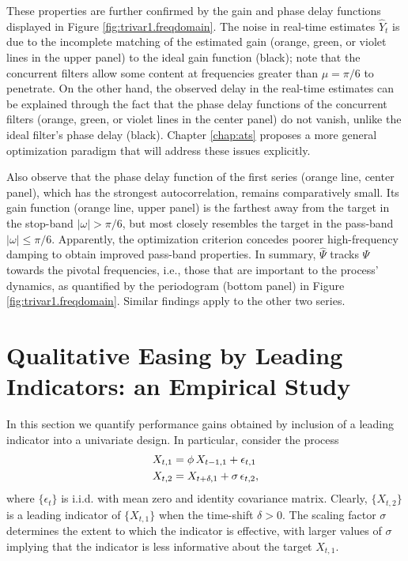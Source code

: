 \documentclass[a4paper]{book}
\begin{document}
 These properties are further confirmed by the gain and phase delay
 functions displayed   in Figure \ref{fig:trivar1.freqdomain}.   
 The noise  in real-time estimates $\widehat{Y}_t$  
 is due to the incomplete matching of the estimated gain (orange, green, or
 violet lines in the upper panel) to the ideal gain function (black); 
  note that the concurrent
 filters allow some   content at frequencies greater than $\mu = \pi/6$
 to penetrate.  On the other hand, the observed delay in the real-time
 estimates can be explained through the fact that the phase delay functions
 of the concurrent filters (orange, green, or
 violet lines in the center panel) do not vanish, unlike the ideal
 filter's phase delay (black).    Chapter \ref{chap:ats} 
proposes a more general optimization paradigm that will address these issues 
explicitly.

 Also observe that the phase delay function of the first series
 (orange line, center panel), which has the strongest autocorrelation,
  remains comparatively small. Its gain function (orange line, upper panel) 
 is the farthest away from the target in the stop-band $|\omega| >\pi/6$,
   but most closely resembles the target in the pass-band 
	$|\omega| \leq\pi/6$.
  Apparently,  the optimization criterion concedes
 poorer high-frequency damping to obtain improved pass-band properties. 
 In summary, $\widehat{\Psi}$ tracks $\Psi$ towards the pivotal
 frequencies, i.e., those that are important to the process'
 dynamics, as quantified by the periodogram (bottom panel) in 
 Figure \ref{fig:trivar1.freqdomain}.  
Similar findings apply to the other two series.




\section{Qualitative Easing by Leading Indicators: an Empirical Study}
   \label{sec:leading.ind}

In this section we quantify performance gains 
  obtained by inclusion of a leading indicator into a univariate design.
 In particular, consider the process
\begin{align}
 X_{t,1} & = \phi \, X_{t-1,1} + \epsilon_{t,1} \notag \\
 X_{t,2} & = X_{t+\delta,1} + \sigma \, \epsilon_{t,2}, \label{def_led_i}
\end{align} 
  where $\{ \epsilon_t \}$ is i.i.d. with mean zero and identity covariance matrix.
  Clearly, $\{ X_{t,2} \}$ is a leading indicator of $\{ X_{t,1} \}$ when
 the time-shift  $\delta > 0$.   The scaling factor $\sigma$ determines  
 the extent to which the indicator is effective, with 
 larger values of  $\sigma$ implying that the indicator is less 
informative about the target $X_{t,1}$.
\end{document}
